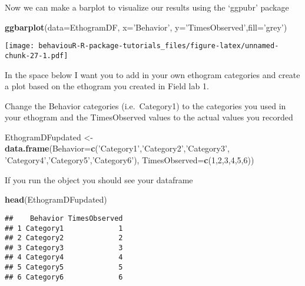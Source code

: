 \documentclass[]{book}
\newenvironment{Shaded}{\begin{snugshade}}{\end{snugshade}}
\newcommand{\DataTypeTok}[1]{\textcolor[rgb]{0.13,0.29,0.53}{#1}}
\newcommand{\DecValTok}[1]{\textcolor[rgb]{0.00,0.00,0.81}{#1}}
\newcommand{\KeywordTok}[1]{\textcolor[rgb]{0.13,0.29,0.53}{\textbf{#1}}}
\newcommand{\NormalTok}[1]{#1}
\newcommand{\StringTok}[1]{\textcolor[rgb]{0.31,0.60,0.02}{#1}}
\begin{document}
Now we can make a barplot to visualize our results using the `ggpubr' package

\begin{Shaded}
\begin{Highlighting}[]
\KeywordTok{ggbarplot}\NormalTok{(}\DataTypeTok{data=}\NormalTok{EthogramDF, }\DataTypeTok{x=}\StringTok{'Behavior'}\NormalTok{, }\DataTypeTok{y=}\StringTok{'TimesObserved'}\NormalTok{,}\DataTypeTok{fill=}\StringTok{'grey'}\NormalTok{)}
\end{Highlighting}
\end{Shaded}

\texttt{[image: behaviouR-R-package-tutorials\_files/figure-latex/unnamed-chunk-27-1.pdf]}

In the space below I want you to add in your own ethogram categories and create a plot based on the ethogram you created in Field lab 1.

Change the Behavior categories (i.e.~Category1) to the categories you used in your ethogram and the TimesObserved values to the actual values you recorded

\begin{Shaded}
\begin{Highlighting}[]
\NormalTok{EthogramDFupdated <-}\StringTok{ }\KeywordTok{data.frame}\NormalTok{(}\DataTypeTok{Behavior=}\KeywordTok{c}\NormalTok{(}\StringTok{'Category1'}\NormalTok{,}\StringTok{'Category2'}\NormalTok{,}\StringTok{'Category3'}\NormalTok{,}
                                           \StringTok{'Category4'}\NormalTok{,}\StringTok{'Category5'}\NormalTok{,}\StringTok{'Category6'}\NormalTok{),}
                         \DataTypeTok{TimesObserved=}\KeywordTok{c}\NormalTok{(}\DecValTok{1}\NormalTok{,}\DecValTok{2}\NormalTok{,}\DecValTok{3}\NormalTok{,}\DecValTok{4}\NormalTok{,}\DecValTok{5}\NormalTok{,}\DecValTok{6}\NormalTok{))}
\end{Highlighting}
\end{Shaded}

If you run the object you should see your dataframe

\begin{Shaded}
\begin{Highlighting}[]
\KeywordTok{head}\NormalTok{(EthogramDFupdated)}
\end{Highlighting}
\end{Shaded}

\begin{verbatim}
##    Behavior TimesObserved
## 1 Category1             1
## 2 Category2             2
## 3 Category3             3
## 4 Category4             4
## 5 Category5             5
## 6 Category6             6
\end{verbatim}
\end{document}
